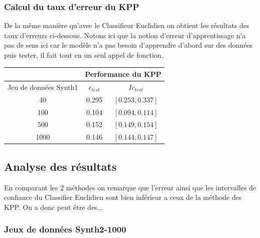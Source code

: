 \documentclass[10pt]{article}
\begin{document}
				\subsubsection{Calcul du taux d'erreur du KPP }
				De la même manière qu'avec le Classifieur Euclidien on obtient les résultats des taux d'erreurs ci-dessous. Notons ici que la notion d'erreur d'apprentissage n'a pas de sens ici car le modèle n'a pas besoin d'apprendre d'abord sur des données puis tester, il fait tout en un seul appel de fonction.
		\begin{center}		
			\begin{tabular}{ | c | c | c |}
				\rowcolor{lightgray} 
				  &  \multicolumn{2}{c}{Performance du KPP}\\
				
				\hline
				Jeu de données Synth1 &   $\epsilon_{test}$ &  $Ic_{test}$\\
				\hline
				\multirow{1}{*}{40}       &0.295  & $[0.253, 0.337]$ 			 \\
				
				\hline
				\multirow{1}{*}{100}      & 0.104 	& $[0.094, 0.114]$  \\
				
				\hline
				\multirow{1}{*}{500}      &  0.152  & 	$[0.149, 0.154]$	\\
				
				\hline
				\multirow{1}{*}{1000}      & 0.146  & 	$[0.144, 0.147]$ 		\\
				
				\hline
			\end{tabular}
		\end{center}
	

			\subsection{Analyse des résultats } 
			 En comparant les 2 méthodes on remarque que l'erreur ainsi que les intervalles de confiance du Classifier Euclidien sont bien inférieur a ceux de la méthode des KPP. On a donc peut être des... 
			
				\subsubsection{ Jeux de données Synth2-1000}
				
\end{document}
